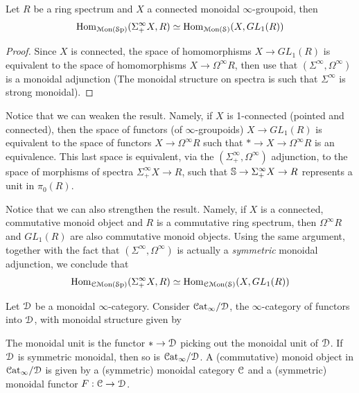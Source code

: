 \documentclass[10pt]{amsart}
\begin{document}
\begin{lemma}\label{lem:adj}
	Let $R$ be a ring spectrum and $X$ a connected monoidal $\infty$-groupoid, then \[\mathrm{Hom}_{\mathcal{M}\mathrm{on}(\mathcal{S}\mathrm{p})}(\Sigma^{\infty}_+X,R)\simeq\mathrm{Hom}_{\mathcal{M}\mathrm{on}(\mathcal{S})}(X,GL_1(R))\] 
\end{lemma}
\begin{proof}
	Since $X$ is connected, the space of homomorphisms $X\to GL_1(R)$ is equivalent to the space of homomorphisms $X\to\Omega^\infty R$, then use that $(\Sigma^\infty,\Omega^\infty)$ is a monoidal adjunction (The monoidal structure on spectra is such that $\Sigma^\infty$ is strong monoidal). 
\end{proof}
\begin{remark}
	Notice that we can weaken the result. Namely, if $X$ is 1-connected (pointed and connected), then the space of functors (of $\infty$-groupoids) $X\to GL_1(R)$ is equivalent to the space of functors $X\to\Omega^\infty R$ such that $*\to X\to\Omega^\infty R$ is an equivalence. This last space is equivalent, via the $(\Sigma^\infty_+,\Omega^\infty)$ adjunction, to the space of morphisms of spectra $\Sigma^\infty_+X\to R$, such that $\mathbb{S}\to\Sigma^\infty_+X\to R$ represents a unit in $\pi_0(R)$.
\end{remark}
\begin{remark}\label{rmk:strengthen}
	Notice that we can also strengthen the result. Namely, if $X$ is a connected, commutative monoid object and $R$ is a commutative ring spectrum, then $\Omega^\infty R$ and $GL_1(R)$ are also commutative monoid objects. Using the same argument, together with the fact that $(\Sigma^\infty,\Omega^\infty)$ is actually a \emph{symmetric} monoidal adjunction, we conclude that \[\mathrm{Hom}_{\mathcal{C}\mathcal{M}\mathrm{on}(\mathcal{S}\mathrm{p})}(\Sigma^\infty_+X,R)\simeq\mathrm{Hom}_{\mathcal{C}\mathcal{M}\mathrm{on}(\mathcal{S})}(X,GL_1(R))\] 
\end{remark}
\begin{remark}\label{rmk:moncat}
	Let $\mathcal{D}$ be a monoidal $\infty$-category. Consider $\mathcal{C}\mathrm{at}_\infty/\mathcal{D}$, the $\infty$-category of functors into $\mathcal{D}$, with monoidal structure given by \begin{center}
	\end{center} The monoidal unit is the functor $*\to\mathcal{D}$ picking out the monoidal unit of $\mathcal{D}$. If $\mathcal{D}$ is symmetric monoidal, then so is $\mathcal{C}\mathrm{at}_\infty/\mathcal{D}$. A (commutative) monoid object in $\mathcal{C}\mathrm{at}_\infty/\mathcal{D}$ is given by a (symmetric) monoidal category $\mathcal{C}$ and a (symmetric) monoidal functor $F:\mathcal{C}\to\mathcal{D}$. 
\end{remark}
\end{document}
